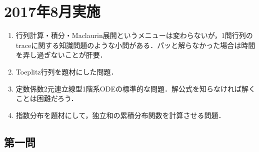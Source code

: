 \documentclass[uplatex,dvipdfmx]{jsarticle}
\begin{document}
\section{2017年8月実施}

\begin{tcolorbox}[colframe=ForestGreen, colback=ForestGreen!10!white,breakable,colbacktitle=ForestGreen!40!white,coltitle=black,fonttitle=\bfseries\sffamily,
    title=概観]
    \begin{enumerate}[{第}1{問}]
        \item 行列計算・積分・Maclaurin展開というメニューは変わらないが，1問行列のtraceに関する知識問題のような小問がある．パッと解らなかった場合は時間を弄し過ぎないことが肝要．
        \item Toeplitz行列を題材にした問題．
        \item 定数係数2元連立線型1階系ODEの標準的な問題．解公式を知らなければ解くことは困難だろう．
        \item 指数分布を題材にして，独立和の累積分布関数を計算させる問題．
    \end{enumerate}
\end{tcolorbox}

\subsection{第一問}
\end{document}
